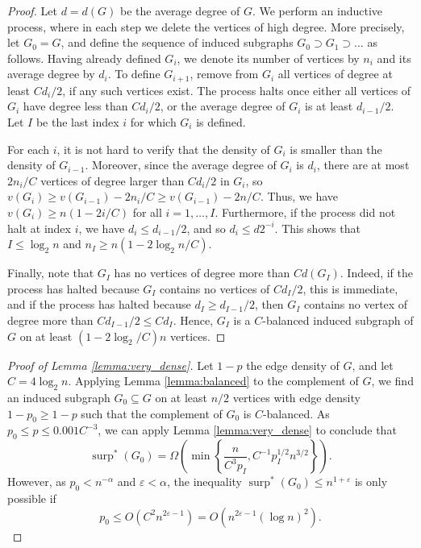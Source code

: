 \documentclass[11pt]{article}
\theoremstyle{plain}
\theoremstyle{definition}
\DeclareMathOperator{\surp}{surp}
\newcommand{\eps}{\varepsilon}
\begin{document}
\begin{proof}
Let $d=d(G)$ be the average degree of $G$. We perform an inductive process, where in each step we delete the vertices of high degree. More precisely, let $G_0=G$, and define the sequence of induced subgraphs $G_0\supset G_1\supset...$ as follows. Having already defined $G_i$, we denote its number of vertices by $n_i$ and its average degree by $d_i$. To define $G_{i+1}$, remove from $G_i$ all vertices of degree at least $Cd_i/2$, if any such vertices exist. The process halts once either all vertices of $G_i$ have degree less than $Cd_i/2$, or the average degree of $G_i$ is at least $d_{i-1}/2$. Let $I$ be the last index $i$ for which $G_i$ is defined. 

For each $i$, it is not hard to verify that the density of $G_i$ is smaller than the density of $G_{i-1}$. Moreover, since the average degree of $G_i$ is $d_i$, there are at most $2n_i/C$ vertices of degree larger than $Cd_i/2$ in $G_i$, so $v(G_i)\geq v(G_{i-1})-2n_i/C\geq v(G_{i-1})-2n/C$. Thus, we have $v(G_i)\geq n(1-2i/C)$ for all $i=1, \dots, I$. Furthermore, if the process did not halt at index $i$, we have $d_i\leq d_{i-1}/2$, and so $d_i\leq d2^{-i}$. This shows that $I\leq \log_2 n$ and $n_I\geq n(1-2\log_2 n/C)$. 

Finally, note that $G_I$ has no vertices of degree more than $C d(G_I)$. Indeed, if the process has halted because $G_I$ contains no vertices of $Cd_I/2$, this is immediate, and if the process has halted because $d_I\geq d_{I-1}/2$, then $G_I$ contains no vertex of degree more than $Cd_{I-1}/2\leq Cd_I$. Hence, $G_I$ is a $C$-balanced induced subgraph of $G$ on at least $(1-2\log_2/C)n$ vertices.
\end{proof}

\begin{proof}[Proof of Lemma \ref{lemma:very_dense}]
Let $1-p$ the edge density of $G$, and let $C=4\log_2 n$. Applying Lemma \ref{lemma:balanced} to the complement of $G$, we find an induced subgraph $G_0\subseteq G$ on at least $n/2$ vertices with edge density $1-p_0\geq 1-p$ such that the complement of $G_0$ is $C$-balanced. As $p_0\leq p\leq 0.001C^{-3}$, we can apply Lemma \ref{lemma:very_dense} to conclude that 
$$\surp^*(G_0)=\Omega\left(\min\left\{\frac{n}{C^3p_I},C^{-1}p_I^{1/2}n^{3/2}\right\}\right).$$
However, as $p_0<n^{-\alpha}$ and $\eps<\alpha$, the inequality $\surp^*(G_0)\leq n^{1+\eps}$ is only possible if 
$$p_0\leq O(C^2n^{2\eps-1})=O(n^{2\eps-1}(\log n)^2).$$
\end{proof}
\end{document}
